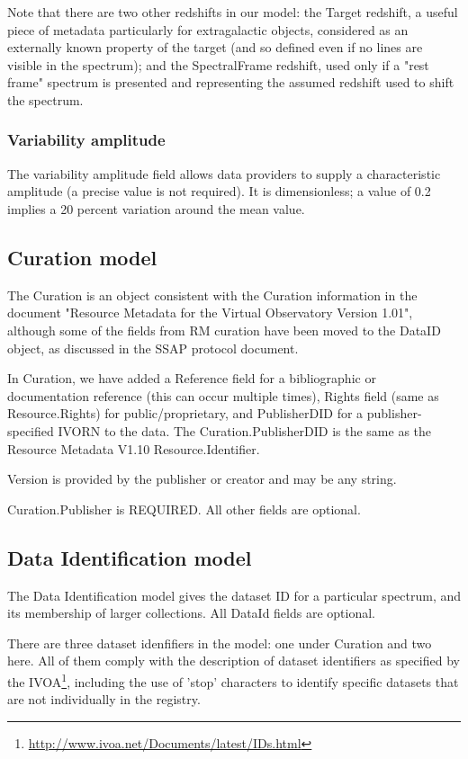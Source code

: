 \documentclass[11pt]{article}
\begin{document}
Note that there are two other redshifts in our model: the Target redshift,
a useful piece of metadata particularly for extragalactic objects,
considered as an externally known property of the target (and so defined
even if no lines are visible in the spectrum); and the SpectralFrame
redshift, used only if a "rest frame" spectrum is presented and
representing the assumed redshift used to shift the spectrum.

\subsubsection{Variability amplitude}

The variability amplitude field allows data providers to supply
a characteristic amplitude (a precise value is not required).
It is dimensionless; a value of 0.2 implies a 20 percent variation
around the mean value.



\subsection{Curation model}

The Curation is an object consistent with the Curation information in
the document "Resource Metadata for the Virtual Observatory Version
1.01",
although some of the fields from RM curation have been moved to the DataID
object, as discussed in the SSAP protocol document.


In Curation, we have added a Reference field for a bibliographic or documentation
reference (this can occur multiple times), Rights field (same as Resource.Rights)
for public/proprietary, and PublisherDID
for a publisher-specified IVORN to the data. The Curation.PublisherDID
is the same as the Resource Metadata V1.10 Resource.Identifier.

Version is provided by the publisher or creator and may be any string.
 
Curation.Publisher is REQUIRED. All other
fields are optional.  


\subsection{Data Identification model}


The Data Identification model gives the dataset ID for a particular
spectrum, and its membership of larger collections.
All DataId fields are optional. 

There are three dataset idenfifiers in the model: one under Curation
and two here. All of them comply with the description of dataset identifiers
as specified by the IVOA\footnote{\url{http://www.ivoa.net/Documents/latest/IDs.html}},
including the use of 'stop' characters to identify specific datasets
that are not individually in the registry.
 
\end{document}
